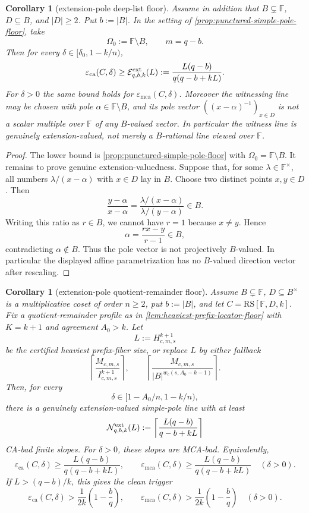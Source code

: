 \documentclass[11pt]{article}
\newtheorem{corollary}[theorem]{Corollary}
\theoremstyle{definition}
\theoremstyle{remark}
\newcommand{\F}{\mathbb{F}}
\newcommand{\B}{B}
\newcommand{\RS}{\mathrm{RS}}
\newcommand{\eca}{\varepsilon_{\mathrm{ca}}}
\newcommand{\emca}{\varepsilon_{\mathrm{mca}}}
\begin{document}
\begin{corollary}[extension-pole deep-list floor]
\label{cor:extension-pole-deep-list-floor}
Assume in addition that $\B\subsetneq\F$, $D\subseteq\B$, and $|D|\ge2$.  Put
$b:=|\B|$.  In the setting of
\cref{prop:punctured-simple-pole-floor}, take
\[
        \Omega_0:=\F\setminus\B,
        \qquad m=q-b .
\]
Then for every $\delta\in[\delta_0,1-k/n)$,
\[
        \eca(C,\delta)
        \ge
        \mathcal E^{\rm ext}_{q,b,k}(L)
        :=
        \frac{L(q-b)}{q(q-b+kL)} .
\]
For $\delta>0$ the same bound holds for $\emca(C,\delta)$.  Moreover the
witnessing line may be chosen with pole $\alpha\in\F\setminus\B$, and its pole
vector $((x-\alpha)^{-1})_{x\in D}$ is not a scalar multiple over $\F$ of any
$\B$-valued vector.  In particular the witness line is genuinely
extension-valued, not merely a $\B$-rational line viewed over $\F$.
\end{corollary}

\begin{proof}
The lower bound is \cref{prop:punctured-simple-pole-floor} with
$\Omega_0=\F\setminus\B$.  It remains to prove genuine extension-valuedness.
Suppose that, for some $\lambda\in\F^\times$, all numbers
$\lambda/(x-\alpha)$ with $x\in D$ lay in $\B$.  Choose two distinct points
$x,y\in D$.  Then
\[
        \frac{y-\alpha}{x-\alpha}
        =
        \frac{\lambda/(x-\alpha)}{\lambda/(y-\alpha)}
        \in \B .
\]
Writing this ratio as $r\in\B$, we cannot have $r=1$ because $x\ne y$.  Hence
\[
        \alpha=\frac{rx-y}{r-1}\in\B,
\]
contradicting $\alpha\notin\B$.  Thus the pole vector is not projectively
$\B$-valued.  In particular the displayed affine parametrization has no
$\B$-valued direction vector after rescaling.
\end{proof}

\begin{corollary}[extension-pole quotient-remainder floor]
\label{cor:extension-pole-quotient-remainder-floor}
Assume $\B\subsetneq\F$, $D\subseteq\B^\times$ is a multiplicative coset of order
$n\ge2$, put $b:=|\B|$, and let $C=\RS[\F,D,k]$.
Fix a quotient-remainder profile as in
\cref{lem:heaviest-prefix-locator-floor} with $K=k+1$ and agreement $A_0>k$.
Let
\[
        L:=H_{c,m,s}^{k+1}
\]
be the certified heaviest prefix-fiber size, or replace $L$ by either fallback
\[
        \left\lceil \frac{M_{c,m,s}}{I_{c,m,s}^{k+1}}\right\rceil,
        \qquad
        \left\lceil\frac{M_{c,m,s}}{|\B|^{w_c(s,A_0-k-1)}}\right\rceil .
\]
Then, for every
\[
        \delta\in[1-A_0/n,1-k/n),
\]
there is a genuinely extension-valued simple-pole line with at least
\[
        \mathcal N^{\rm ext}_{q,b,k}(L)
        :=
        \left\lceil\frac{L(q-b)}{q-b+kL}\right\rceil
\]
CA-bad finite slopes.  For $\delta>0$, these slopes are MCA-bad.  Equivalently,
\[
        \eca(C,\delta)
        \ge
        \frac{L(q-b)}{q(q-b+kL)},
        \qquad
        \emca(C,\delta)
        \ge
        \frac{L(q-b)}{q(q-b+kL)}
        \quad(\delta>0).
\]
If $L>(q-b)/k$, this gives the clean trigger
\[
        \eca(C,\delta)>
        \frac1{2k}\left(1-\frac bq\right),
        \qquad
        \emca(C,\delta)>
        \frac1{2k}\left(1-\frac bq\right)
        \quad(\delta>0).
\]
\end{corollary}
\end{document}
